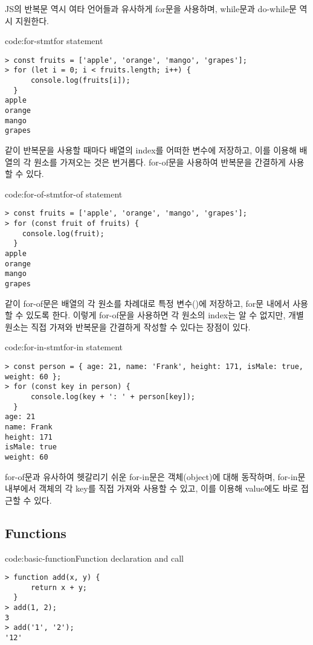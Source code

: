 JS의 반복문 역시 여타 언어들과 유사하게 for문을 사용하며, while문과 do-while문 역시 지원한다.

\begin{code}{code:for-stmt}{for statement}
\begin{verbatim}
> const fruits = ['apple', 'orange', 'mango', 'grapes'];
> for (let i = 0; i < fruits.length; i++) {
      console.log(fruits[i]);
  }
apple
orange
mango
grapes
\end{verbatim}
\end{code}

\와 같이 반복문을 사용할 때마다 배열의 index를 어떠한 변수에 저장하고, 이를 이용해 배열의 각 원소를 가져오는 것은 번거롭다. for-of문을 사용하여 반복문을 간결하게 사용할 수 있다.

\begin{code}{code:for-of-stmt}{for-of statement}
\begin{verbatim}
> const fruits = ['apple', 'orange', 'mango', 'grapes'];
> for (const fruit of fruits) {
    console.log(fruit);
  }
apple
orange
mango
grapes
\end{verbatim}
\end{code}

\와 같이 for-of문은 배열의 각 원소를 차례대로 특정 변수()에 저장하고, for문 내에서 사용할 수 있도록 한다. 이렇게 for-of문을 사용하면 각 원소의 index는 알 수 없지만, 개별 원소는 직접 가져와 반복문을 간결하게 작성할 수 있다는 장점이 있다.

\begin{code}{code:for-in-stmt}{for-in statement}
\begin{verbatim}
> const person = { age: 21, name: 'Frank', height: 171, isMale: true, weight: 60 };
> for (const key in person) {
      console.log(key + ': ' + person[key]);
  }
age: 21
name: Frank
height: 171
isMale: true
weight: 60
\end{verbatim}
\end{code}

for-of문과 유사하여 헷갈리기 쉬운 for-in문은 객체(object)에 대해 동작하며, for-in문 내부에서 객체의 각 key를 직접 가져와 사용할 수 있고, 이를 이용해 value에도 바로 접근할 수 있다.

\subsection*{Functions}

\begin{code}{code:basic-function}{Function declaration and call}
\begin{verbatim}
> function add(x, y) {
      return x + y;
  }
> add(1, 2);
3
> add('1', '2');
'12'
\end{verbatim}
\end{code}

